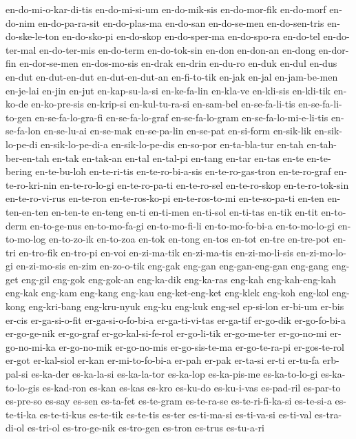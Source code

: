 {en-do-mi-o-kar-di-tis en-do-mi-si-um en-do-mik-sis en-do-mor-fik
en-do-morf en-do-nim en-do-pa-ra-sit en-do-plas-ma en-do-san en-do-se-men
en-do-sen-tris en-do-ske-le-ton en-do-sko-pi en-do-skop en-do-sper-ma
en-do-spo-ra en-do-tel en-do-ter-mal en-do-ter-mis en-do-term
en-do-tok-sin en-don en-don-an en-dong en-dor-fin en-dor-se-men
en-dos-mo-sis en-drak en-drin en-du-ro en-duk en-dul en-dus en-dut
en-dut-en-dut en-dut-en-dut-an en-fi-to-tik en-jak en-jal en-jam-be-men
en-je-lai en-jin en-jut en-kap-su-la-si en-ke-fa-lin en-kla-ve en-kli-sis
en-kli-tik en-ko-de en-ko-pre-sis en-krip-si en-kul-tu-ra-si en-sam-bel
en-se-fa-li-tis en-se-fa-li-to-gen en-se-fa-lo-gra-fi en-se-fa-lo-graf
en-se-fa-lo-gram en-se-fa-lo-mi-e-li-tis en-se-fa-lon en-se-lu-ai
en-se-mak en-se-pa-lin en-se-pat en-si-form en-sik-lik en-sik-lo-pe-di
en-sik-lo-pe-di-a en-sik-lo-pe-dis en-so-por en-ta-bla-tur en-tah
en-tah-ber-en-tah en-tak en-tak-an en-tal en-tal-pi en-tang en-tar en-tas
en-te en-te-bering en-te-bu-loh en-te-ri-tis en-te-ro-bi-a-sis
en-te-ro-gas-tron en-te-ro-graf en-te-ro-kri-nin en-te-ro-lo-gi
en-te-ro-pa-ti en-te-ro-sel en-te-ro-skop en-te-ro-tok-sin en-te-ro-vi-rus
en-te-ron en-te-ros-ko-pi en-te-ros-to-mi en-te-so-pa-ti en-ten
en-ten-en-ten en-ten-te en-teng en-ti en-ti-men en-ti-sol en-ti-tas en-tik
en-tit en-to-derm en-to-ge-nus en-to-mo-fa-gi en-to-mo-fi-li
en-to-mo-fo-bi-a en-to-mo-lo-gi en-to-mo-log en-to-zo-ik en-to-zoa en-tok
en-tong en-tos en-tot en-tre en-tre-pot en-tri en-tro-fik en-tro-pi en-voi
en-zi-ma-tik en-zi-ma-tis en-zi-mo-li-sis en-zi-mo-lo-gi en-zi-mo-sis
en-zim en-zo-o-tik eng-gak eng-gan eng-gan-eng-gan eng-gang eng-get
eng-gil eng-gok eng-gok-an eng-ka-dik eng-ka-ras eng-kah eng-kah-eng-kah
eng-kak eng-kam eng-kang eng-kau eng-ket-eng-ket eng-klek eng-koh eng-kol
eng-kong eng-kri-bang eng-kru-nyuk eng-ku eng-kuk eng-sel ep-si-lon
er-bi-um er-bis er-cis er-ga-si-o-fit er-ga-si-o-fo-bi-a er-ga-ti-vi-tas
er-ga-tif er-go-dik er-go-fo-bi-a er-go-ge-nik er-go-graf
er-go-kal-si-fe-rol er-go-li-tik er-go-me-ter er-go-no-mi er-go-no-mi-ka
er-go-no-mik er-go-no-mis er-go-sis-te-ma er-go-te-ra-pi er-gos-te-rol
er-got er-kal-siol er-kan er-mi-to-fo-bi-a er-pah er-pak er-ta-si er-ti
er-tu-fa erb-pal-si es-ka-der es-ka-la-si es-ka-la-tor es-ka-lop
es-ka-pis-me es-ka-to-lo-gi es-ka-to-lo-gis es-kad-ron es-kan es-kas
es-kro es-ku-do es-ku-i-vas es-pad-ril es-par-to es-pre-so es-say es-sen
es-ta-fet es-te-gram es-te-ra-se es-te-ri-fi-ka-si es-te-si-a es-te-ti-ka
es-te-ti-kus es-te-tik es-te-tis es-ter es-ti-ma-si es-ti-va-si es-ti-val
es-tra-di-ol es-tri-ol es-tro-ge-nik es-tro-gen es-tron es-trus es-tu-a-ri
}
